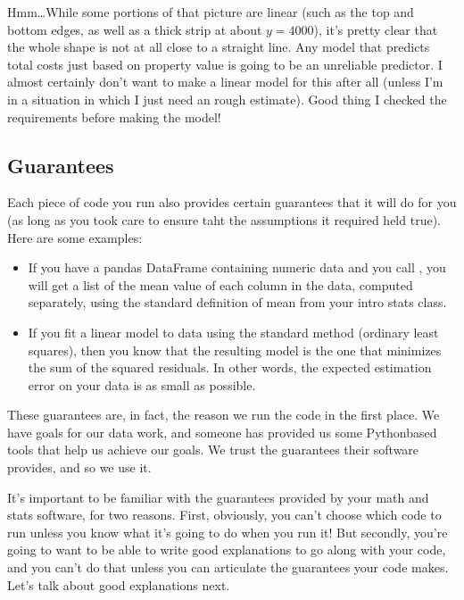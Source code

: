 \documentclass[letterpaper,10pt,english]{sphinxmanual}
\begin{document}
\noindent{}

Hmm…While some portions of that picture are linear (such as the top and bottom edges, as well as a thick strip at about \(y=4000\)), it’s pretty clear that the whole shape is not at all close to a straight line.  Any model that predicts total costs just based on property value is going to be an unreliable predictor.  I almost certainly don’t want to make a linear model for this after all (unless I’m in a situation in which I just need an  rough estimate).  Good thing I checked the requirements before making the model!


\subsection{Guarantees}
\label{\detokenize{chapter-5-before-and-after:guarantees}}
Each piece of code you run also provides certain guarantees that it will do for you (as long as you took care to ensure taht the assumptions it required held true).  Here are some examples:
\begin{itemize}
\item {} 
If you have a pandas DataFrame  containing numeric data and you call , you will get a list of the mean value of each column in the data, computed separately, using the standard definition of mean from your intro stats class.

\item {} 
If you fit a linear model to data using the standard method (ordinary least squares), then you know that the resulting model is the one that minimizes the sum of the squared residuals.  In other words, the expected estimation error on your data is as small as possible.

\end{itemize}

These guarantees are, in fact, the reason we run the code in the first place.  We have goals for our data work, and someone has provided us some Python\sphinxhyphen{}based tools that help us achieve our goals.  We trust the guarantees their software provides, and so we use it.

It’s important to be familiar with the guarantees provided by your math and stats software, for two reasons.  First, obviously, you can’t choose which code to run unless you know what it’s going to do when you run it!  But secondly, you’re going to want to be able to write good explanations to go along with your code, and you can’t do that unless you can articulate the guarantees your code makes.  Let’s talk about good explanations next.
\end{document}
